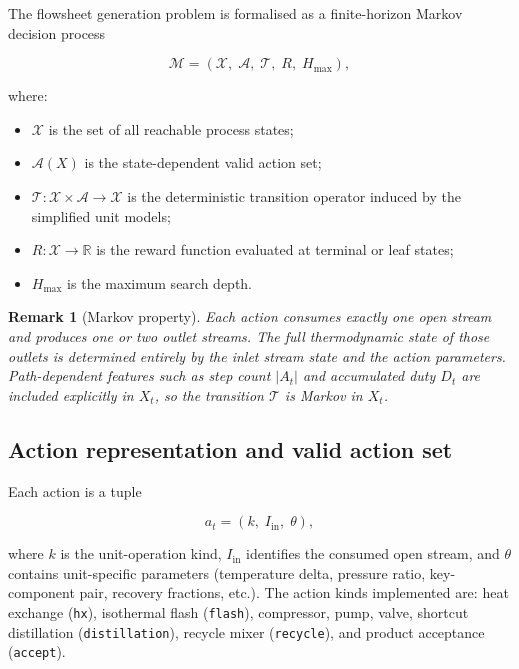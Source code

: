 \documentclass[11pt,a4paper]{article}
\theoremstyle{definition}
\theoremstyle{plain}
\newtheorem{remark}{Remark}[section]
\newcommand{\R}{\mathbb{R}}
\newcommand{\calA}{\mathcal{A}}
\newcommand{\calX}{\mathcal{X}}
\newcommand{\calT}{\mathcal{T}}
\newcommand{\calM}{\mathcal{M}}
\newcommand{\abs}[1]{\left|#1\right|}
\begin{document}
The flowsheet generation problem is formalised as a finite-horizon Markov decision process

\begin{equation}
 \calM = (\calX,\; \calA,\; \calT,\; R,\; H_{\max}),
\end{equation}

where:

\begin{itemize}
 \item $\calX$ is the set of all reachable process states;
 \item $\calA(X)$ is the state-dependent valid action set;
 \item $\calT : \calX \times \calA \to \calX$ is the
  deterministic transition operator induced by the simplified
  unit models;
 \item $R : \calX \to \R$ is the reward function evaluated at
  terminal or leaf states;
 \item $H_{\max}$ is the maximum search depth.
\end{itemize}

\begin{remark}[Markov property]
 Each action consumes exactly one open stream and produces one or two outlet streams. The full thermodynamic state of those outlets is determined entirely by the inlet stream state and the action parameters. Path-dependent features such as step count $\abs{A_t}$ and accumulated duty $D_t$ are included explicitly in $X_t$, so the transition $\calT$ is Markov in $X_t$.
\end{remark}

\subsection{Action representation and valid action set}
\label{sec:actions}

Each action is a tuple

\begin{equation}
 a_t = (k,\; I_{\mathrm{in}},\; \theta),
\end{equation}

where $k$ is the unit-operation kind, $I_{\mathrm{in}}$ identifies the consumed open stream, and $\theta$ contains unit-specific parameters (temperature delta, pressure ratio, key-component pair, recovery fractions, etc.). The action kinds implemented are: heat exchange (\texttt{hx}), isothermal flash (\texttt{flash}), compressor, pump, valve, shortcut distillation (\texttt{distillation}), recycle mixer (\texttt{recycle}), and product acceptance (\texttt{accept}).
\end{document}
